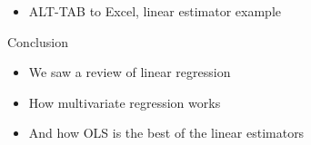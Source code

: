 \documentclass[australian,ignorenonframetext,aspectratio=169]{beamer}
\providecommand{\tightlist}{%
  \setlength{\itemsep}{0pt}\setlength{\parskip}{0pt}}
\begin{document}
\begin{frame}[standout]{}
\protect\hypertarget{section-2}{}

\begin{itemize}
\tightlist
\item
  ALT-TAB to Excel, linear estimator example
\end{itemize}

\end{frame}

\begin{frame}{Conclusion}
\protect\hypertarget{conclusion}{}

\begin{itemize}
\tightlist
\item
  We saw a review of linear regression
\item
  How multivariate regression works
\item
  And how OLS is the best of the linear estimators
\end{itemize}

\end{frame}
\end{document}
